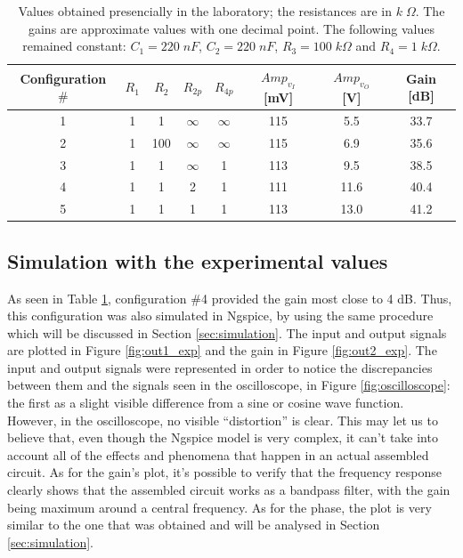 \begin{table}[H]
    \centering
    \begin{tabular}{|c|c|c|c|c|c|c|c|}
        \hline
        Configuration $\#$ & $R_1$ & $R_2$ & $R_{2p}$ & $R_{4p}$ & $Amp_{v_I}$ [mV] & $Amp_{v_O}$ [V] & Gain [dB]\\
        \hline
        1 & 1 & 1 & $\infty$ & $\infty$ & 115 & 5.5 & 33.7 \\
        2 & 1 & 100 & $\infty$ & $\infty$ & 115 & 6.9 & 35.6 \\
        3 & 1 & 1 & $\infty$ & 1 & 113 & 9.5 & 38.5 \\
        4 & 1 & 1 & 2 & 1 & 111 & 11.6 & 40.4 \\
        5 & 1 & 1 & 1 & 1 & 113 & 13.0 & 41.2 \\
        \hline
    \end{tabular}
    \caption{Values obtained presencially in the laboratory; the resistances are in $k\;\Omega$. The gains are approximate values with one decimal point. The following values remained constant: $C_1=220\;nF$, $C_2=220\;nF$, $R_3=100\;k\Omega$ and $R_4=1\;k\Omega$.}
    \label{tab:lab_results}
\end{table}

\subsection{Simulation with the experimental values}

As seen in Table \ref{tab:lab_results}, configuration $\#$4 provided the gain most close to 4 dB. Thus, this configuration was also simulated in Ngspice, by using the same procedure which will be discussed in Section \ref{sec:simulation}. The input and output signals are plotted in Figure \ref{fig:out1_exp} and the gain in Figure \ref{fig:out2_exp}. The input and output signals were represented in order to notice the discrepancies between them and the signals seen in the oscilloscope, in Figure \ref{fig:oscilloscope}: the first as a slight visible difference from a sine or cosine wave function. However, in the oscilloscope, no visible ``distortion'' is clear. This may let us to believe that, even though the Ngspice model is very complex, it can't take into account all of the effects and phenomena that happen in an actual assembled circuit. As for the gain's plot, it's possible to verify that the frequency response clearly shows that the assembled circuit works as a bandpass filter, with the gain being maximum around a central frequency. As for the phase, the plot is very similar to the one that was obtained and will be analysed in Section \ref{sec:simulation}.

